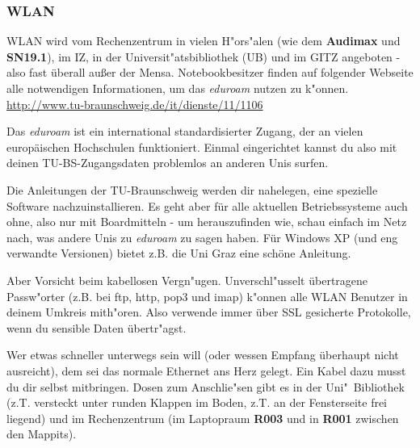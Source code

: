 \begin{multicols}{2}
	\subsubsection{WLAN}
		\label{wlan}
		WLAN wird vom Rechenzentrum in vielen H"ors"alen (wie dem \textbf{Audimax} und \textbf{SN19.1}), im IZ, in der Universit"atsbibliothek (UB) und im GITZ angeboten - also fast überall außer der Mensa. Notebookbesitzer finden auf folgender Webseite alle notwendigen Informationen, um das \emph{eduroam} nutzen zu k"onnen. \url{http://www.tu-braunschweig.de/it/dienste/11/1106}

		Das \emph{eduroam} ist ein international standardisierter Zugang, der an vielen europäischen Hochschulen funktioniert. Einmal eingerichtet kannst du also mit deinen TU-BS-Zugangsdaten problemlos an anderen Unis surfen.

		Die Anleitungen der TU-Braunschweig werden dir nahelegen, eine spezielle Software nachzuinstallieren. Es geht aber für alle aktuellen Betriebssysteme auch ohne, also nur mit Boardmitteln - um herauszufinden wie, schau einfach im Netz nach, was andere Unis zu \emph{eduroam} zu sagen haben. Für Windows XP (und eng verwandte Versionen) bietet z.B. die Uni Graz eine schöne Anleitung.

		Aber Vorsicht beim kabellosen Vergn"ugen. Unverschl"usselt übertragene Passw"orter (z.B. bei ftp, http, pop3 und imap) k"onnen alle WLAN Benutzer in deinem Umkreis mith"oren. Also verwende immer über SSL gesicherte Protokolle, wenn du sensible Daten übertr"agst.

		Wer etwas schneller unterwegs sein will (oder wessen Empfang überhaupt nicht ausreicht), dem sei das normale Ethernet ans Herz gelegt. Ein Kabel dazu musst du dir selbst mitbringen. Dosen zum Anschlie"sen gibt es in der Uni"~Bibliothek (z.T. versteckt unter runden Klappen im Boden, z.T. an der Fensterseite frei liegend) und im Rechenzentrum (im Laptopraum \textbf{R003} und in \textbf{R001} zwischen den Mappits).


\end{multicols}
